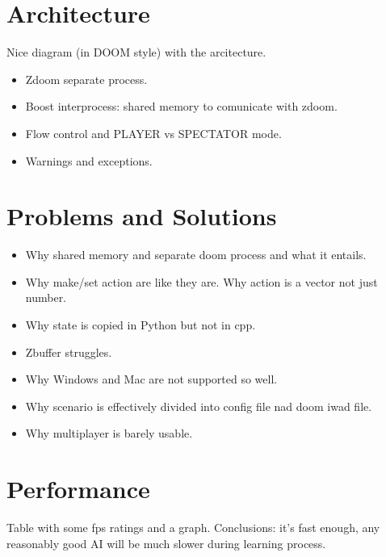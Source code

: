 \section{Architecture}
Nice diagram (in DOOM style) with the arcitecture.
\begin{itemize}
\item Zdoom separate process.
\item Boost interprocess: shared memory to comunicate with zdoom.
\item Flow control and PLAYER vs SPECTATOR mode.
\item Warnings and exceptions.
\end{itemize}

\section{Problems and Solutions}
\begin{itemize}
\item Why shared memory and separate doom process and what it entails.
\item Why make/set action are like they are. Why action is a vector not just number.
\item Why state is copied in Python but not in cpp.
\item Zbuffer struggles.
\item Why Windows and Mac are not supported so well.
\item Why scenario is effectively divided into config file nad doom iwad file.
\item Why multiplayer is barely usable.
\end{itemize}

\section{Performance}
Table with some fps ratings and a graph.
Conclusions: it's fast enough, any reasonably good AI will be much slower during learning process.




